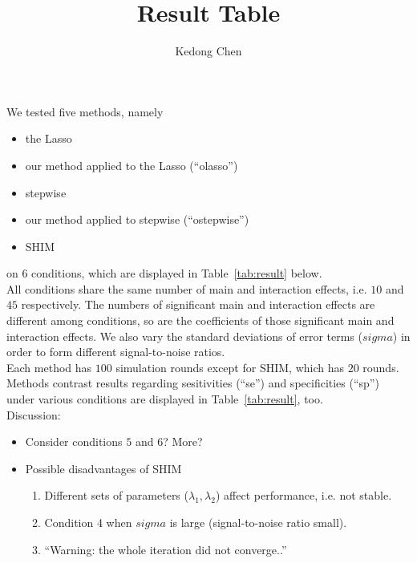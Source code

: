 \documentclass[12pt]{article}\usepackage[]{graphicx}\usepackage[]{color}
\begin{document}
\title{Result Table}
\author{Kedong Chen}
\maketitle



%

We tested five methods, namely
\begin{itemize}

\item the Lasso
\item our method applied to the Lasso (``olasso'')\footnotemark[1]
\item stepwise
\item our method applied to stepwise (``ostepwise'')\footnotemark[1]
\item SHIM

\end{itemize}
on $6$ conditions, which are displayed in Table~\ref{tab:result} below.
\\

All conditions share the same number of main and interaction effects, i.e. $10$ and $45$ respectively. The numbers of significant main and interaction effects are different among conditions, so are the coefficients of those significant main and interaction effects. We also vary the standard deviations of error terms ($sigma$) in order to form different signal-to-noise ratios.
\\

Each method has $100$ simulation rounds except for SHIM, which has $20$ rounds. Methods contrast results regarding sesitivities (``se'') and specificities (``sp'') under various conditions are displayed in Table~\ref{tab:result}, too.
\\

Discussion:
\begin{itemize}
\item Consider conditions $5$ and $6$? More?
\item Possible disadvantages of SHIM
  
  \begin{enumerate}
  \item Different sets of parameters ($\lambda_1,\lambda_2$) affect performance, i.e. not stable.
  \item Condition 4 when $sigma$ is large (signal-to-noise ratio small).
  \item ``Warning: the whole iteration did not converge..''
  \end{enumerate}
  
\end{itemize}
\end{document}
